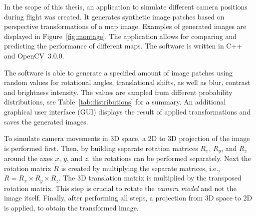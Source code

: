 \documentclass{report}
\begin{document}
In the scope of this thesis, an application to simulate different
camera positions during flight was created. It generates synthetic
image patches based on perspective transformations of a map
image. Examples of generated images are displayed in
Figure~\ref{fig:montage}. The application allows for comparing and
predicting the performance of different maps. The software is written
in C++ and OpenCV~3.0.0.

The software is able to generate a specified amount of image patches
using random values for rotational angles, translational shifts, as
well as blur, contrast and brightness intensity. The values are
sampled from different probability distributions, see
Table~\ref{tab:distributions} for a summary. An additional graphical
user interface (GUI) displays the result of applied transformations
and saves the generated images.

To simulate camera movements in 3D space, a 2D to 3D projection of the
image is performed first. Then, by building separate rotation matrices
$R_x$, $R_y$, and $R_z$ around the axes $x$, $y$, and $z$, the
rotations can be performed separately. Next the rotation matrix $R$ is
created by multiplying the separate matrices, i.e.,
$R = R_x \times R_y \times R_z$. The 3D translation matrix is
multiplied by the transposed rotation matrix. This step is crucial to
rotate the \emph{camera model} and not the image itself. Finally,
after performing all steps, a projection from 3D space to 2D is
applied, to obtain the transformed image.
\end{document}
